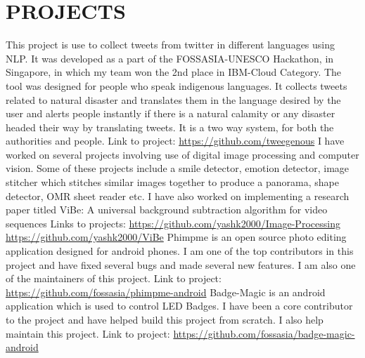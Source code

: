 \documentclass[11pt,a4paper,sans]{moderncv}        %
\begin{document}
\section{PROJECTS}
{This project is use to collect tweets from twitter in different languages using NLP. It was developed as a part of the FOSSASIA-UNESCO Hackathon, in Singapore, in which my team won the 2nd place in IBM-Cloud Category. The tool was designed for people who speak indigenous languages. It collects tweets related to natural disaster and translates them in the language desired by the user and alerts people instantly if there is a natural calamity or any disaster headed their way by translating tweets. It is a two way system, for both the authorities and people.  Link to project:{\newline}
\url{https://github.com/tweegenous}}{}
{I have worked on several projects involving use of digital image processing and computer vision. Some of these projects include a smile detector, emotion detector, image stitcher which stitches similar images together to produce a panorama, shape detector, OMR sheet reader etc. I have also worked on implementing a research paper titled ViBe: A universal background subtraction algorithm for video sequences Links to projects:{\newline} \url{https://github.com/yashk2000/Image-Processing} {\newline} \url{https://github.com/yashk2000/ViBe}}{}  %
{Phimpme is an open source photo editing application designed for android phones. I am one of the top contributors in this project and have fixed several bugs and made several new features. I am also one of the maintainers of this project. Link to project:{\newline} \url{https://github.com/fossasia/phimpme-android}}{}  %
{Badge-Magic is an android application which is used to control LED Badges. I have been a core contributor to the project and have helped build this project from scratch. I also help maintain this project. Link to project:{\newline} \url{https://github.com/fossasia/badge-magic-android}}{}  %
\end{document}
